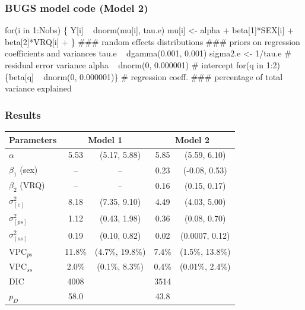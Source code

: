 \documentclass{beamer}
\begin{document}
\begin{frame}[fragile]
\frametitle{BUGS model code (Model 2)}
\vspace{-0.3cm}
\begin{footnotesize}
\begin{ColorVerbatim}
for(i in 1:Nobs) \{
 Y[i] ~ dnorm(mu[i], tau.e)
 mu[i] <- alpha + beta[1]*SEX[i] + beta[2]*VRQ[i] +
                \color{red}{theta.ps[PID[i]]}\color{black}{ +}\color{blue}{ theta.ss[SID[i]]}
\}
### random effects distributions
### priors on regression coefficients and variances
 tau.e ~ dgamma(0.001, 0.001)
 sigma2.e <- 1/tau.e           # residual error variance
\color{red}{ tau.ps ~ dgamma(0.001, 0.001)}
\color{red}{ sigma2.ps <- 1/tau.ps         # between primary school var.}
\color{blue}{ tau.ss ~ dgamma(0.001, 0.001)}
\color{blue}{ sigma2.ss <- 1/tau.ss         # between secondary school var.}
 alpha ~ dnorm(0, 0.000001)    # intercept
 for(q in 1:2) \{beta[q] ~ dnorm(0, 0.000001)\} # regression coeff.
### percentage of total variance explained
\color{red}{ VPC.ps <- sigma2.ps/(sigma2.e+sigma2.ps+sigma2.ss) # primary}
\color{blue}{ VPC.ss <- sigma2.ss/(sigma2.e+sigma2.ps+sigma2.ss) # secondary}
\end{ColorVerbatim}
\end{footnotesize}
\end{frame}

\begin{frame}
\frametitle{Results}
\renewcommand{\arraystretch}{1.2}
\begin{center}
\begin{tabular}{l  c  c c c }
\hline
Parameters & \multicolumn{2}{c}{Model 1}  & \multicolumn{2}{c}{Model 2}  \\
\hline
$\alpha$ &  5.53 & (5.17, 5.88) & 5.85 & (5.59, 6.10)   \\
$\beta_1$ (sex) & -- & --  &  0.23 & (-0.08, 0.53) \\
$\beta_2$ (VRQ) & -- & -- & 0.16 & (0.15, 0.17) \\
$\sigma_{[e]}^2$ & 8.18 & (7.35, 9.10)&  4.49 & (4.03, 5.00) \\
$\sigma_{[ps]}^2$& 1.12 & (0.43, 1.98) & 0.36 & (0.08, 0.70) \\
$\sigma_{[ss]}^2$& 0.19 & (0.10, 0.82) & 0.02 & (0.0007, 0.12)\\
VPC$_{ps}$ & 11.8\%  & (4.7\%, 19.8\%) & 7.4\% & (1.5\%, 13.8\%) \\
VPC$_{ss}$ & 2.0\% &  (0.1\%, 8.3\%) & 0.4\% & (0.01\%, 2.4\%) \\
\hline
DIC & 4008 & &  3514 & \\
$p_D$ & 58.0 & & 43.8 & \\
\hline
\end{tabular}
\end{center}
\renewcommand{\arraystretch}{1}
\end{frame}
\end{document}

